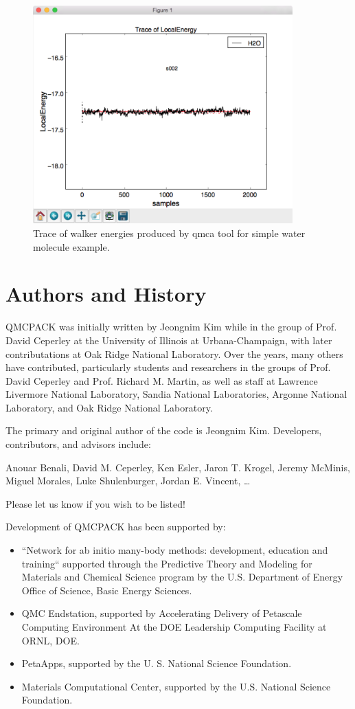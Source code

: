 \begin{figure}
  \centering
  \includegraphics[width=10cm]{figures/quick_qmca_dmc_trace.png}
  \caption{Trace of walker energies produced by qmca tool for simple
    water molecule example.}
  \label{fig:quick_qmca_dmc_trace}
\end{figure}

\section{Authors and History}
\label{sec:history}
QMCPACK was initially written by Jeongnim Kim while in the group of
Prof. David Ceperley at the University of Illinois at
Urbana-Champaign, with later contributations at Oak Ridge National Laboratory. Over the years, many others have contributed, particularly
students and researchers in the groups of Prof. David Ceperley
and Prof. Richard M. Martin, as well as staff at Lawrence Livermore
National Laboratory, Sandia National Laboratories, Argonne National
Laboratory, and Oak Ridge National Laboratory.

The primary and original author of the code is Jeongnim
Kim. Developers, contributors, and advisors include:

Anouar Benali,  
David M. Ceperley, 
Ken Esler,
Jaron T. Krogel,
Jeremy McMinis,
Miguel Morales,
Luke Shulenburger,
Jordan E. Vincent,
\ldots

Please let us know if you wish to be listed!

Development of QMCPACK has been supported by:
\begin{itemize}
\item “Network for ab initio many-body methods: development, education
  and training“ supported through the Predictive
  Theory and Modeling for Materials and Chemical Science program by
  the U.S. Department of Energy Office of Science, Basic Energy
  Sciences.
\item QMC Endstation, supported by Accelerating Delivery of Petascale
  Computing Environment At the DOE Leadership Computing Facility at
  ORNL, DOE. 
\item PetaApps, supported by the U. S. National Science
  Foundation.
\item Materials Computational Center, supported by the
  U.S. National Science Foundation.
\end{itemize}




